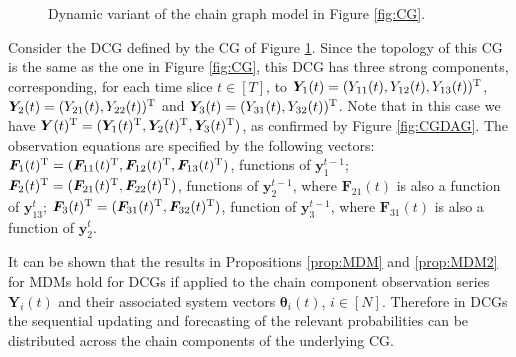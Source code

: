 \begin{figure}
\vspace{-0.2cm}
\begin{center}
\end{center}
\vspace{-.4cm}
\caption{Dynamic variant of the chain graph model in Figure \ref{fig:CG}. \label{fig:DCG}}
\end{figure}

\begin{example}
Consider the DCG defined by the CG of Figure \ref{fig:DCG}. Since the topology of this CG is the same as the one in Figure \ref{fig:CG}, this DCG has three strong components, corresponding, for each time slice $t\in[T]$, to $\bm{Y}_1(t)=(Y_{11}(t),Y_{12}(t),Y_{13}(t))^{\textnormal{T}}$, $\bm{Y}_{2}(t)=(Y_{21}(t),Y_{22}(t))^{\textnormal{T}}$ and $\bm{Y}_{3}(t)=(Y_{31}(t),Y_{32}(t))^{\textnormal{T}}$. Note that in this case we have $\bm{Y}(t)^{\textnormal{T}}=(\bm{Y}_1(t)^{\textnormal{T}},\bm{Y}_2(t)^{\textnormal{T}},\bm{Y}_3(t)^{\textnormal{T}})$, as confirmed by Figure \ref{fig:CGDAG}. The observation equations are specified by the following vectors: $\bm{F}_1(t)^{\textnormal{T}}=(\bm{F}_{11}(t)^{\textnormal{T}},\bm{F}_{12}(t)^{\textnormal{T}},\bm{F}_{13}(t)^{\textnormal{T}})$, functions of $\bm{y}^{t-1}_1$; $\bm{F}_2(t)^{\textnormal{T}}=(\bm{F}_{21}(t)^{\textnormal{T}},\bm{F}_{22}(t)^{\textnormal{T}})$, functions of $\bm{y}^{t-1}_2$, where $\bm{F}_{21}(t)$ is also a function of $\bm{y}^t_{13}$; $\bm{F}_3(t)^{\textnormal{T}}=(\bm{F}_{31}(t)^{\textnormal{T}},\bm{F}_{32}(t)^{\textnormal{T}})$, function of $\bm{y}^{t-1}_3$, where $\bm{F}_{31}(t)$ is also a function of $\bm{y}^t_2$. 
\end{example}

It can be shown that the results in Propositions \ref{prop:MDM} and \ref{prop:MDM2} for MDMs hold for DCGs if applied to the chain component observation series $\bm{Y}_i(t)$ and their associated system vectors $\bm{\theta}_i(t)$,  $i\in [N]$. Therefore in DCGs the sequential updating and forecasting of the  relevant probabilities can be distributed across the chain components of the underlying CG. 

